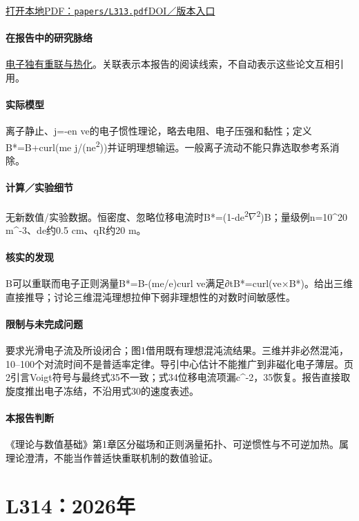 \documentclass[UTF8,a4paper,11pt,openany,fontset=fandol]{ctexbook}
\begin{document}
\href{run:../papers/L313.pdf}{打开本地PDF：\texttt{papers/L313.pdf}}\quad\href{https://doi.org/10.1063/5.0304789}{DOI／版本入口}

\paragraph{在报告中的研究脉络}\hyperref[story:energy]{电子独有重联与热化}。关联表示本报告的阅读线索，不自动表示这些论文互相引用。

\paragraph{实际模型}离子静止、j=-en ve的电子惯性理论，略去电阻、电子压强和黏性；定义B*=B+curl(me j/(ne\textsuperscript{2}))并证明理想输运。一般离子流动不能只靠选取参考系消除。

\paragraph{计算／实验细节}无新数值/实验数据。恒密度、忽略位移电流时B*=(1-de\textsuperscript{2}\ensuremath{\nabla}\textsuperscript{2})B；量级例n=10\textasciicircum{}20 m\textasciicircum{}-3、de约0.5 cm、qR约20 m。

\paragraph{核实的发现}B可以重联而电子正则涡量B*=B-(me/e)curl ve满足∂tB*=curl(ve×B*)。给出三维直接推导；讨论三维混沌理想拉伸下弱非理想性的对数时间敏感性。

\paragraph{限制与未完成问题}要求光滑电子流及所设闭合；图1借用既有理想混沌流结果。三维并非必然混沌，10–100个对流时间不是普适率定律。导引中心估计不能推广到非磁化电子薄层。页2引言Voigt符号与最终式35不一致；式34位移电流项漏c\textasciicircum{}-2，35恢复。报告直接取旋度推出电子冻结，不沿用式30的速度表述。

\paragraph{本报告判断}《理论与数值基础》第1章区分磁场和正则涡量拓扑、可逆惯性与不可逆加热。属理论澄清，不能当作普适快重联机制的数值验证。

\section{L314：2026年}\label{paper:L314}
\end{document}
